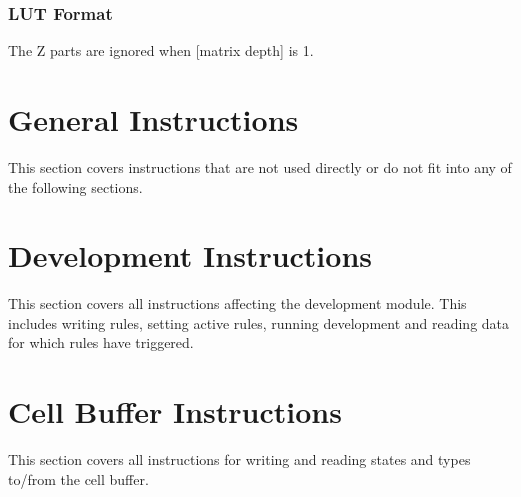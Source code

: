 \documentclass[a4paper]{article}
\begin{document}
\subsubsection*{LUT Format}


\notes

The Z parts are ignored when [matrix depth] is 1.

\section{General Instructions}

This section covers instructions that are not used directly or do not fit into any of the following sections.









\section{Development Instructions}

This section covers all instructions affecting the development module.
This includes writing rules, setting active rules, running development and reading data for which rules have triggered.









\section{Cell Buffer Instructions}

This section covers all instructions for writing and reading states and types to/from the cell buffer.





\end{document}
